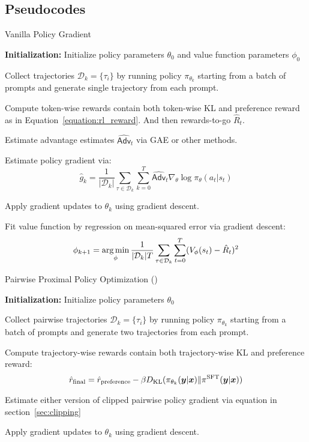 \documentclass{article} %
\newcommand{\algn}{\text{P3O}}
\begin{document}
\subsection{Pseudocodes}
\label{appendix:pseudocode}
\begin{algorithm}[h]
\caption{Vanilla Policy Gradient}\label{pseudocode:vpg}
\begin{algorithmic}[1]
\State \textbf{Initialization:} Initialize policy parameters $\theta_0$ and value function parameters $\phi_0$

    \State Collect trajectories $\mathcal{D}_k=\{\tau_i\}$ by running policy $\pi_{\theta_k}$ starting from a batch of prompts and 
    \Statex\hspace{\algorithmicindent}generate single trajectory from each prompt.

    \State Compute token-wise rewards contain both token-wise KL and preference reward as in
    \Statex\hspace{\algorithmicindent}Equation~\ref{equation:rl_reward}. And then rewards-to-go $\hat{R}_t$.

    \State Estimate advantage estimates $\widehat{\textsf{Adv}}_t$ via GAE or other methods.

    \State Estimate policy gradient via:
    $$\hat{g}_k = \frac{1}{|\mathcal{D}_k|}\sum_{\tau\in\mathcal{D}_k}\sum_{k=0}^T\widehat{\textsf{Adv}}_t\nabla_\theta\log\pi_\theta(a_t|s_t)$$

    \State Apply gradient updates to $\theta_k$ using gradient descent.

    \State Fit value function by regression on mean-squared error via gradient descent:
    $$\phi_{k+1} = \operatorname*{arg\,min}_{\phi}\frac{1}{|\mathcal{D}_k|T}\sum_{\tau\in\mathcal{D}_k}\sum^T_{t=0}(V_\phi(s_t)-\hat{R}_t)^2$$

\EndFor
\end{algorithmic}
\end{algorithm}

\begin{algorithm}[h]
\caption{Pairwise Proximal Policy Optimization (\algn)}\label{pseudocode:p3o}
\begin{algorithmic}[1]
\State \textbf{Initialization:} Initialize policy parameters $\theta_0$

    \State Collect pairwise trajectories $\mathcal{D}_k=\{\tau_i\}$ by running policy $\pi_{\theta_k}$ starting from a batch of 
    \Statex\hspace{\algorithmicindent}prompts and generate two trajectories from each prompt.

    \State Compute trajectory-wise rewards contain both trajectory-wise KL and preference reward:
    $$\hat{r}_{\text{final}} = \hat{r}_{\text{preference}} - \beta D_{\mathrm{KL}}(\pi_{\theta_k}({\bm{y}}|{\bm{x}})\|\pi^{\text{SFT}}({\bm{y}}|{\bm{x}}))$$

    \State Estimate either version of clipped pairwise policy gradient via equation in section~\ref{sec:clipping}

    \State Apply gradient updates to $\theta_k$ using gradient descent.

\EndFor
\end{algorithmic}
\end{algorithm}
\end{document}
